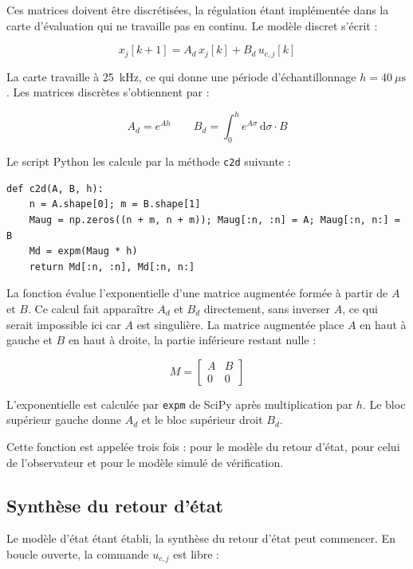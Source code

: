 Ces matrices doivent être discrétisées, la régulation étant implémentée dans la carte d'évaluation qui ne travaille pas en continu. Le modèle discret s'écrit :

\begin{equation}
    x_j[k+1] = A_d\,x_j[k] + B_d\,u_{c,j}[k]
\end{equation}

La carte travaille à 25~kHz, ce qui donne une période d'échantillonnage $h = 40~\mu\mathrm{s}$. Les matrices discrètes s'obtiennent par :

\begin{equation}
    A_d = e^{A h}
    \qquad
    B_d = \int_0^h e^{A\sigma}\,\mathrm d\sigma \cdot B
    \label{eq:discretisation}
\end{equation}

Le script Python les calcule par la méthode \texttt{c2d} suivante :

\begin{verbatim}
def c2d(A, B, h):
    n = A.shape[0]; m = B.shape[1]
    Maug = np.zeros((n + m, n + m)); Maug[:n, :n] = A; Maug[:n, n:] = B
    Md = expm(Maug * h)
    return Md[:n, :n], Md[:n, n:]
\end{verbatim}

La fonction évalue l'exponentielle d'une matrice augmentée formée à partir de $A$ et $B$. Ce calcul fait apparaître $A_d$ et $B_d$ directement, sans inverser $A$, ce qui serait impossible ici car $A$ est singulière. La matrice augmentée place $A$ en haut à gauche et $B$ en haut à droite, la partie inférieure restant nulle :

\begin{equation}
    M =
    \begin{bmatrix}
        A & B \\
        0 & 0
    \end{bmatrix}
\end{equation}

L'exponentielle est calculée par \texttt{expm} de SciPy après multiplication par $h$. Le bloc supérieur gauche donne $A_d$ et le bloc supérieur droit $B_d$.

Cette fonction est appelée trois fois : pour le modèle du retour d'état, pour celui de l'observateur et pour le modèle simulé de vérification.

\subsection{Synthèse du retour d'état}
\label{subsec:RetourEtat}
Le modèle d'état étant établi, la synthèse du retour d'état peut commencer. En boucle ouverte, la commande $u_{c,j}$ est libre :

